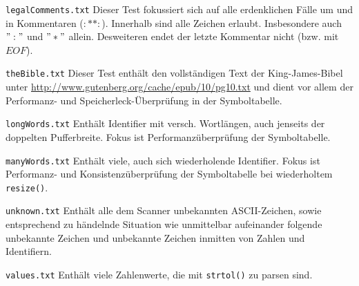 \documentclass[
a4paper,   %
11pt,      %
oneside,   %
onecolumn, %
final      %
]{article}
\newcommand{\code}[1]{\lstinline$#1$}
\begin{document}
\begin{description}
\item{\texttt{legalComments.txt}} Dieser Test fokussiert sich auf alle erdenklichen Fälle um und in Kommentaren ($:* *:$). Innerhalb sind alle Zeichen erlaubt. Insbesondere auch $":"$ und $"*"$ allein. Desweiteren endet der letzte Kommentar nicht (bzw. mit $EOF$).

\item{\texttt{theBible.txt}} Dieser Test enthält den vollständigen Text der King-James-Bibel unter \url{http://www.gutenberg.org/cache/epub/10/pg10.txt} und dient vor allem der Performanz- und Speicherleck-Überprüfung in der Symboltabelle.

\item{\texttt{longWords.txt}} Enthält Identifier mit versch. Wortlängen, auch jenseits der doppelten Pufferbreite. Fokus ist Performanzüberprüfung der Symboltabelle.

\item{\texttt{manyWords.txt}} Enthält viele, auch sich wiederholende Identifier. Fokus ist Performanz- und Konsistenzüberprüfung der Symboltabelle bei wiederholtem \code{resize()}.

\item{\texttt{unknown.txt}} Enthält alle dem Scanner unbekannten ASCII-Zeichen, sowie entsprechend zu händelnde Situation wie unmittelbar aufeinander folgende unbekannte Zeichen und unbekannte Zeichen inmitten von Zahlen und Identifiern.

\item{\texttt{values.txt}} Enthält viele Zahlenwerte, die mit \code{strtol()} zu parsen sind.

\end{description}



\end{document}
